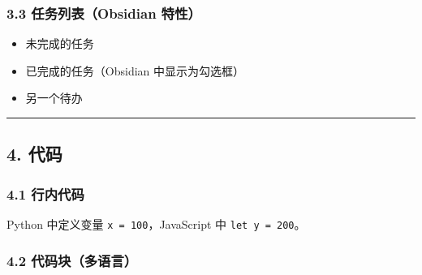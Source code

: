 \documentclass[]{article}
\providecommand{\tightlist}{\itemsep0pt}
\begin{document}
\subsubsection{3.3 任务列表（Obsidian
特性）}\label{ux4efbux52a1ux5217ux8868obsidian-ux7279ux6027}

\begin{itemize}
\tightlist
\item[$\square$]
  未完成的任务
\item[$\boxtimes$]
  已完成的任务（Obsidian 中显示为勾选框）
\item[$\square$]
  另一个待办
\end{itemize}

\begin{center}\rule{0.5\linewidth}{0.5pt}\end{center}

\subsection{4. 代码}\label{ux4ee3ux7801}

\subsubsection{4.1 行内代码}\label{ux884cux5185ux4ee3ux7801}

Python 中定义变量 \texttt{x\ =\ 100}，JavaScript 中
\texttt{let\ y\ =\ 200}。

\subsubsection{4.2
代码块（多语言）}\label{ux4ee3ux7801ux5757ux591aux8bedux8a00}

\begin{Shaded}
\begin{Highlighting}[]
    \OperatorTok{\textless{}=} \NormalTok{:}
    \OperatorTok{{-}}\NormalTok{) }\OperatorTok{+}\OperatorTok{{-}}\NormalTok{)}

\OperatorTok{=}\NormalTok{ [fibonacci(i) } \NormalTok{(}\NormalTok{)]}
\end{Highlighting}
\end{Shaded}
\end{document}
